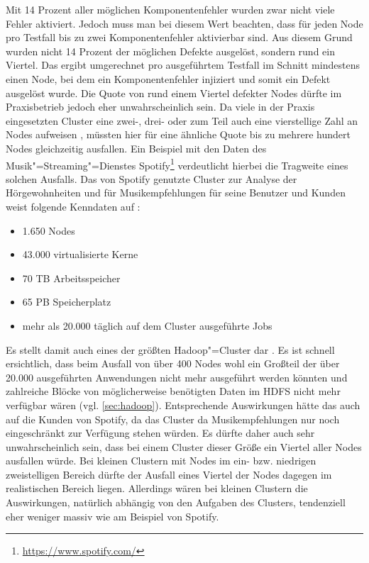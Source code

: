 Mit 14 Prozent aller möglichen Komponentenfehler wurden zwar nicht viele Fehler aktiviert.
Jedoch muss man bei diesem Wert beachten, dass für jeden Node pro Testfall bis zu zwei Komponentenfehler aktivierbar sind.
Aus diesem Grund wurden nicht 14 Prozent der möglichen Defekte ausgelöst, sondern rund ein Viertel.
Das ergibt umgerechnet pro ausgeführtem Testfall im Schnitt mindestens einen Node, bei dem ein Komponentenfehler injiziert und somit ein Defekt ausgelöst wurde.
Die Quote von rund einem Viertel defekter Nodes dürfte im Praxisbetrieb jedoch eher unwahrscheinlich sein.
Da viele in der Praxis eingesetzten Cluster eine zwei-, drei- oder zum Teil auch eine vierstellige Zahl an Nodes aufweisen \cite{PoweredByHadoop}, müssten hier für eine ähnliche Quote bis zu mehrere hundert Nodes gleichzeitig ausfallen.
Ein Beispiel mit den Daten des Musik"=Streaming"=Dienstes Spotify\footnote{\url{https://www.spotify.com/}} verdeutlicht hierbei die Tragweite eines solchen Ausfalls.
Das von Spotify genutzte Cluster zur Analyse der Hörgewohnheiten und für Musikempfehlungen für seine Benutzer und Kunden weist folgende Kenndaten auf \cite{PoweredByHadoop}:

\begin{itemize}
    \item 1.650 Nodes
    \item 43.000 virtualisierte Kerne
    \item 70 TB Arbeitsspeicher
    \item 65 PB Speicherplatz
    \item mehr als 20.000 täglich auf dem Cluster ausgeführte Jobs
\end{itemize}

Es stellt damit auch eines der größten Hadoop"=Cluster dar \cite{PoweredByHadoop}.
Es ist schnell ersichtlich, dass beim Ausfall von über 400 Nodes wohl ein Großteil der über 20.000 ausgeführten Anwendungen nicht mehr ausgeführt werden könnten und zahlreiche Blöcke von möglicherweise benötigten Daten im HDFS nicht mehr verfügbar wären (vgl. \cref{sec:hadoop}).
Entsprechende Auswirkungen hätte das auch auf die Kunden von Spotify, da das Cluster \uA da Musikempfehlungen nur noch eingeschränkt zur Verfügung stehen würden.
Es dürfte daher auch sehr unwahrscheinlich sein, dass bei einem Cluster dieser Größe ein Viertel aller Nodes ausfallen würde.
Bei kleinen Clustern mit Nodes im ein- bzw. niedrigen zweistelligen Bereich dürfte der Ausfall eines Viertel der Nodes dagegen im realistischen Bereich liegen.
Allerdings wären bei kleinen Clustern die Auswirkungen, natürlich abhängig von den Aufgaben des Clusters, tendenziell eher weniger massiv wie am Beispiel von Spotify.

